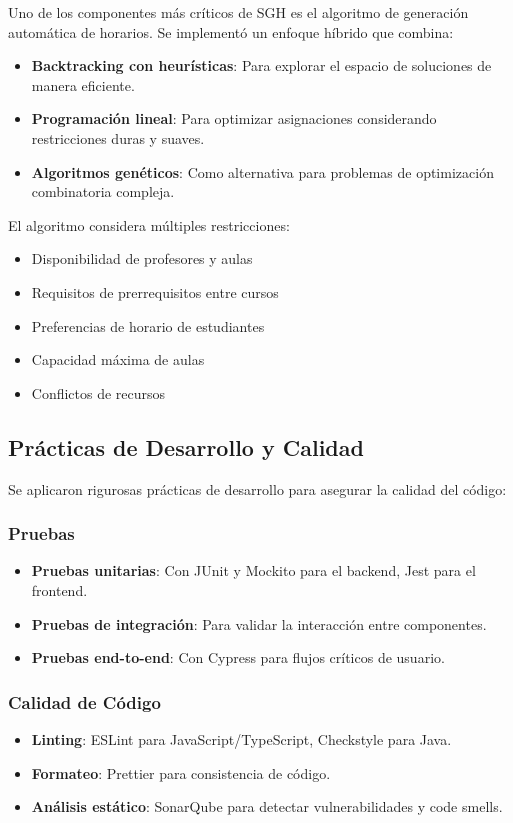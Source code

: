 Uno de los componentes más críticos de SGH es el algoritmo de generación automática de horarios. Se implementó un enfoque híbrido que combina:

\begin{itemize}
\item \textbf{Backtracking con heurísticas}: Para explorar el espacio de soluciones de manera eficiente.
\item \textbf{Programación lineal}: Para optimizar asignaciones considerando restricciones duras y suaves.
\item \textbf{Algoritmos genéticos}: Como alternativa para problemas de optimización combinatoria compleja.
\end{itemize}

El algoritmo considera múltiples restricciones:
\begin{itemize}
\item Disponibilidad de profesores y aulas
\item Requisitos de prerrequisitos entre cursos
\item Preferencias de horario de estudiantes
\item Capacidad máxima de aulas
\item Conflictos de recursos
\end{itemize}

\subsection{Prácticas de Desarrollo y Calidad}

Se aplicaron rigurosas prácticas de desarrollo para asegurar la calidad del código:

\subsubsection{Pruebas}
\begin{itemize}
\item \textbf{Pruebas unitarias}: Con JUnit y Mockito para el backend, Jest para el frontend.
\item \textbf{Pruebas de integración}: Para validar la interacción entre componentes.
\item \textbf{Pruebas end-to-end}: Con Cypress para flujos críticos de usuario.
\end{itemize}

\subsubsection{Calidad de Código}
\begin{itemize}
\item \textbf{Linting}: ESLint para JavaScript/TypeScript, Checkstyle para Java.
\item \textbf{Formateo}: Prettier para consistencia de código.
\item \textbf{Análisis estático}: SonarQube para detectar vulnerabilidades y code smells.
\end{itemize}

